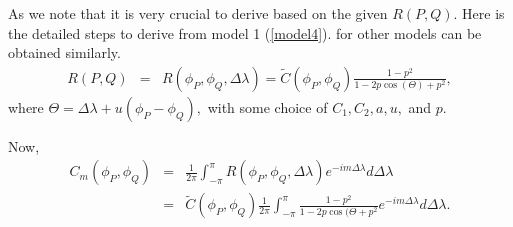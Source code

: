 
%
%

As we note that it is very crucial to derive \Cm based on the given $R(P,Q)$. Here is the detailed steps to derive \Cm from model 1 (\ref{model4}). \Cm for other models can be obtained similarly. 
\begin{eqnarray*}
	R(P, Q) &=& R(\phi_P, \phi_Q, \Delta \lambda) = \tilde{C}(\phi_P, \phi_Q) \frac{1-p^2}{1 - 2p \cos(\Theta)+p^2},
\end{eqnarray*}
where $\Theta = \Delta \lambda + u(\phi_P - \phi_Q),$ with some choice of $C_1, C_2, a, u,$ and $p$.

Now,
\begin{eqnarray*}
	C_m(\phi_P, \phi_Q) &=& \frac{1}{2\pi} \int_{-\pi}^\pi R(\phi_P, \phi_Q, \Delta \lambda) e^{-im\Delta \lambda}d\Delta \lambda \\
	&=& \tilde{C}(\phi_P, \phi_Q) \frac{1}{2\pi}\int_{-\pi}^\pi \frac{1-p^2}{1 - 2p \cos(\Theta+p^2} e^{-im\Delta \lambda}d\Delta \lambda.
\end{eqnarray*}

